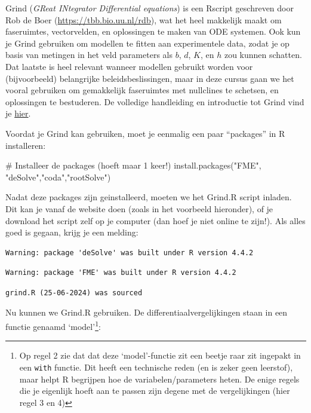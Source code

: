 \documentclass[
  a4paper,
]{scrbook}
\newenvironment{Shaded}{\begin{snugshade}}{\end{snugshade}}
\newcommand{\CommentTok}[1]{\textcolor[rgb]{0.37,0.37,0.37}{#1}}
\newcommand{\FunctionTok}[1]{\textcolor[rgb]{0.28,0.35,0.67}{#1}}
\newcommand{\NormalTok}[1]{\textcolor[rgb]{0.00,0.23,0.31}{#1}}
\newcommand{\StringTok}[1]{\textcolor[rgb]{0.13,0.47,0.30}{#1}}
\theoremstyle{definition}
\theoremstyle{remark}
\begin{document}
Grind (\emph{GReat INtegrator Differential equations}) is een Rscript
geschreven door Rob de Boer (\url{https://tbb.bio.uu.nl/rdb}), wat het
heel makkelijk maakt om faseruimtes, vectorvelden, en oplossingen te
maken van ODE systemen. Ook kun je Grind gebruiken om modellen te fitten
aan experimentele data, zodat je op basis van metingen in het veld
parameters als \(b\), \(d\), \(K\), en \(h\) zou kunnen schatten. Dat
laatste is heel relevant wanneer modellen gebruikt worden voor
(bijvoorbeeld) belangrijke beleidsbeslissingen, maar in deze cursus gaan
we het vooral gebruiken om gemakkelijk faseruimtes met nullclines te
schetsen, en oplossingen te bestuderen. De volledige handleiding en
introductie tot Grind vind je
\href{https://tbb.bio.uu.nl/rdb/grindR/basics.html}{hier}.

Voordat je Grind kan gebruiken, moet je eenmalig een paar ``packages''
in R installeren:

\begin{Shaded}
\begin{Highlighting}[]
\CommentTok{\# Installeer de packages (hoeft maar 1 keer!)}
\FunctionTok{install.packages}\NormalTok{(}\StringTok{"FME"}\NormalTok{, }\StringTok{"deSolve"}\NormalTok{,}\StringTok{"coda"}\NormalTok{,}\StringTok{"rootSolve"}\NormalTok{) }
\end{Highlighting}
\end{Shaded}

Nadat deze packages zijn geinstalleerd, moeten we het Grind.R script
inladen. Dit kan je vanaf de website doen (zoals in het voorbeeld
hieronder), of je download het script zelf op je computer (dan hoef je
niet online te zijn!). Als alles goed is gegaan, krijg je een melding:

\begin{verbatim}
Warning: package 'deSolve' was built under R version 4.4.2
\end{verbatim}

\begin{verbatim}
Warning: package 'FME' was built under R version 4.4.2
\end{verbatim}

\begin{verbatim}
grind.R (25-06-2024) was sourced
\end{verbatim}

Nu kunnen we Grind.R gebruiken. De differentiaalvergelijkingen staan in
een functie genaamd `model'\footnote{Op regel 2 zie dat dat deze
  `model'-functie zit een beetje raar zit ingepakt in een \texttt{with}
  functie. Dit heeft een technische reden (en is zeker geen leerstof),
  maar helpt R begrijpen hoe de variabelen/parameters heten. De enige
  regels die je eigenlijk hoeft aan te passen zijn degene met de
  vergelijkingen (hier regel 3 en 4)}:
\end{document}
